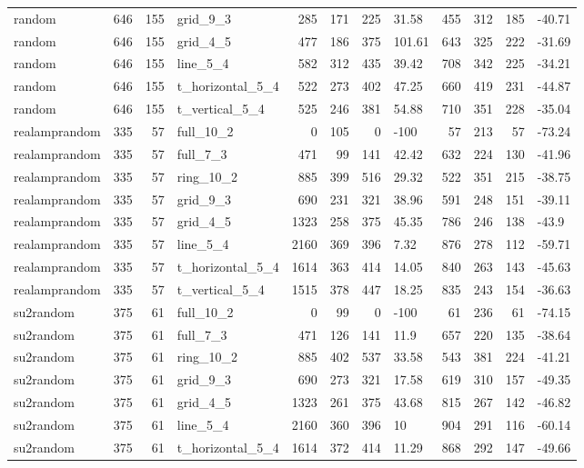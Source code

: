 \begin{longtable}{lrrlrrrlrrrl}
random & 646 & 155 & grid\_9\_3 & 285 & 171 & 225 & 31.58 & 455 & 312 & 185 & -40.71 \\
random & 646 & 155 & grid\_4\_5 & 477 & 186 & 375 & 101.61 & 643 & 325 & 222 & -31.69 \\
random & 646 & 155 & line\_5\_4 & 582 & 312 & 435 & 39.42 & 708 & 342 & 225 & -34.21 \\
random & 646 & 155 & t\_horizontal\_5\_4 & 522 & 273 & 402 & 47.25 & 660 & 419 & 231 & -44.87 \\
random & 646 & 155 & t\_vertical\_5\_4 & 525 & 246 & 381 & 54.88 & 710 & 351 & 228 & -35.04 \\
realamprandom & 335 & 57 & full\_10\_2 & 0 & 105 & 0 & -100 & 57 & 213 & 57 & -73.24 \\
realamprandom & 335 & 57 & full\_7\_3 & 471 & 99 & 141 & 42.42 & 632 & 224 & 130 & -41.96 \\
realamprandom & 335 & 57 & ring\_10\_2 & 885 & 399 & 516 & 29.32 & 522 & 351 & 215 & -38.75 \\
realamprandom & 335 & 57 & grid\_9\_3 & 690 & 231 & 321 & 38.96 & 591 & 248 & 151 & -39.11 \\
realamprandom & 335 & 57 & grid\_4\_5 & 1323 & 258 & 375 & 45.35 & 786 & 246 & 138 & -43.9 \\
realamprandom & 335 & 57 & line\_5\_4 & 2160 & 369 & 396 & 7.32 & 876 & 278 & 112 & -59.71 \\
realamprandom & 335 & 57 & t\_horizontal\_5\_4 & 1614 & 363 & 414 & 14.05 & 840 & 263 & 143 & -45.63 \\
realamprandom & 335 & 57 & t\_vertical\_5\_4 & 1515 & 378 & 447 & 18.25 & 835 & 243 & 154 & -36.63 \\
su2random & 375 & 61 & full\_10\_2 & 0 & 99 & 0 & -100 & 61 & 236 & 61 & -74.15 \\
su2random & 375 & 61 & full\_7\_3 & 471 & 126 & 141 & 11.9 & 657 & 220 & 135 & -38.64 \\
su2random & 375 & 61 & ring\_10\_2 & 885 & 402 & 537 & 33.58 & 543 & 381 & 224 & -41.21 \\
su2random & 375 & 61 & grid\_9\_3 & 690 & 273 & 321 & 17.58 & 619 & 310 & 157 & -49.35 \\
su2random & 375 & 61 & grid\_4\_5 & 1323 & 261 & 375 & 43.68 & 815 & 267 & 142 & -46.82 \\
su2random & 375 & 61 & line\_5\_4 & 2160 & 360 & 396 & 10 & 904 & 291 & 116 & -60.14 \\
su2random & 375 & 61 & t\_horizontal\_5\_4 & 1614 & 372 & 414 & 11.29 & 868 & 292 & 147 & -49.66 \\

\end{longtable}
